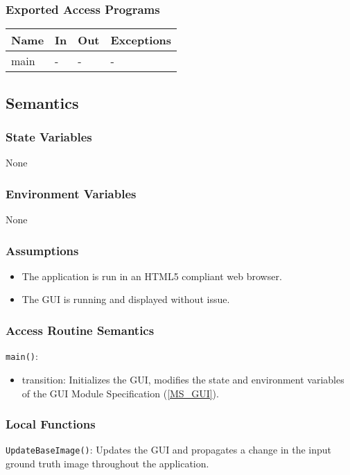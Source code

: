 \documentclass[12pt, titlepage]{article}
\newcommand{\msref}[1]{Module Specification (\ref{#1})}
\newcommand{\code}[1]{\texttt{#1}}
\begin{document}
\subsubsection{Exported Access Programs}

\begin{center}
\begin{tabular}{p{2cm} p{4cm} p{4cm} p{2cm}}
\hline
\textbf{Name} & \textbf{In} & \textbf{Out} & \textbf{Exceptions} \\
\hline
main & - & - & - \\
\hline
\end{tabular}
\end{center}

\subsection{Semantics}

\subsubsection{State Variables}
None

\subsubsection{Environment Variables}
None

\subsubsection{Assumptions}
\begin{itemize}
  \item The application is run in an HTML5 compliant web browser.
  \item The GUI is running and displayed without issue.
\end{itemize}

\subsubsection{Access Routine Semantics}

\noindent \code{main()}:
\begin{itemize}
\item transition: Initializes the GUI, modifies the state and environment variables of the GUI \msref{MS_GUI}.
\end{itemize}

\subsubsection{Local Functions}
\code{UpdateBaseImage()}: Updates the GUI and propagates a change in the input ground truth
image throughout the application.
\newpage
\end{document}
